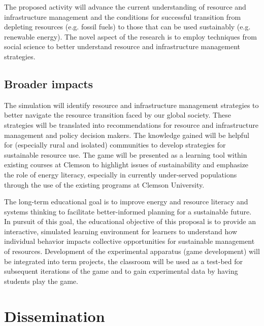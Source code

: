 \documentclass[11pt,a4paper]{article}
\begin{document}

The proposed activity will advance the current understanding of 
resource and infrastructure management and 
the conditions for successful transition from depleting resources (e.g. fossil fuels) 
to those that can be used sustainably (e.g. renewable energy). 
The novel aspect of the research is to employ techniques from social science 
to better understand resource and infrastructure management strategies.

\subsection{Broader impacts}


The simulation will identify resource and infrastructure management strategies 
to better navigate the resource transition faced by our global society. 
These strategies will be translated into recommendations for 
resource and infrastructure management and policy decision makers. 
The knowledge gained will be helpful for (especially rural and isolated) communities 
to develop strategies for sustainable resource use. 
The game will be presented as a learning tool within existing courses at Clemson 
to highlight issues of sustainability and emphasize the role of energy literacy, 
especially in currently under-served populations 
through the use of the existing programs at Clemson University.  

The long-term educational goal is to 
improve energy and resource literacy and systems thinking 
to facilitate better-informed planning for a sustainable future. 
In pursuit of this goal, the educational objective of this proposal 
is to provide an interactive, simulated learning environment for learners 
to understand how individual behavior impacts collective opportunities 
for sustainable management of resources. 
Development of the experimental apparatus (game development) will be integrated into term projects, 
the classroom will be used as a test-bed for subsequent iterations of the game 
and to gain experimental data by having students play the game. 






\section{Dissemination}
\end{document}
